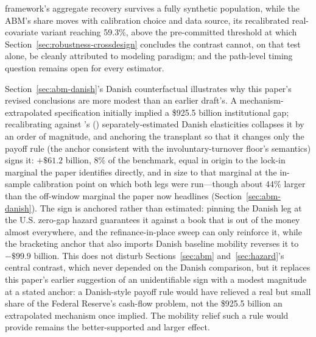 \documentclass[12pt]{article}
\newcommand{\citepos}[1]{\citeauthor{#1}'s (\citeyear{#1})}
\begin{document}
framework's aggregate recovery survives a fully synthetic population, while the ABM's share moves with calibration choice and data source, its recalibrated real-covariate variant reaching 59.3\%, above the pre-committed threshold at which Section~\ref{sec:robustness-crossdesign} concludes the contrast cannot, on that test alone, be cleanly attributed to modeling paradigm; and the path-level timing question remains open for every estimator.

Section~\ref{sec:abm-danish}'s Danish counterfactual illustrates why this paper's revised conclusions are more modest than an earlier draft's. A mechanism-extrapolated specification initially implied a \$925.5 billion institutional gap; recalibrating against \citepos{berger2026} separately-estimated Danish elasticities collapses it by an order of magnitude, and anchoring the transplant so that it changes only the payoff rule (the anchor consistent with the involuntary-turnover floor's semantics) signs it: $+\$61.2$ billion, 8\% of the benchmark, equal in origin to the lock-in marginal the paper identifies directly, and in size to that marginal at the in-sample calibration point on which both legs were run---though about 44\% larger than the off-window marginal the paper now headlines (Section~\ref{sec:abm-danish}). The sign is anchored rather than estimated: pinning the Danish leg at the U.S. zero-gap hazard guarantees it against a book that is out of the money almost everywhere, and the refinance-in-place sweep can only reinforce it, while the bracketing anchor that also imports Danish baseline mobility reverses it to $-\$99.9$ billion. This does not disturb Sections~\ref{sec:abm} and~\ref{sec:hazard}'s central contrast, which never depended on the Danish comparison, but it replaces this paper's earlier suggestion of an unidentifiable sign with a modest magnitude at a stated anchor: a Danish-style payoff rule would have relieved a real but small share of the Federal Reserve's cash-flow problem, not the \$925.5 billion an extrapolated mechanism once implied. The mobility relief such a rule would provide remains the better-supported and larger effect.
\end{document}
